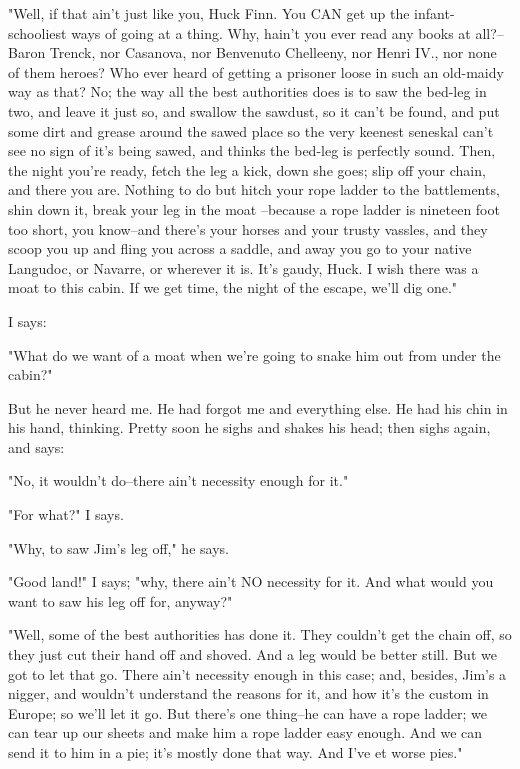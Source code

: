 "Well, if that ain't just like you, Huck Finn.  You CAN get up the
infant-schooliest ways of going at a thing.  Why, hain't you ever read
any books at all?--Baron Trenck, nor Casanova, nor Benvenuto Chelleeny,
nor Henri IV., nor none of them heroes?  Who ever heard of getting a
prisoner loose in such an old-maidy way as that?  No; the way all the
best authorities does is to saw the bed-leg in two, and leave it just so,
and swallow the sawdust, so it can't be found, and put some dirt and
grease around the sawed place so the very keenest seneskal can't see no
sign of it's being sawed, and thinks the bed-leg is perfectly sound.
Then, the night you're ready, fetch the leg a kick, down she goes; slip
off your chain, and there you are.  Nothing to do but hitch your rope
ladder to the battlements, shin down it, break your leg in the moat
--because a rope ladder is nineteen foot too short, you know--and there's
your horses and your trusty vassles, and they scoop you up and fling you
across a saddle, and away you go to your native Langudoc, or Navarre, or
wherever it is. It's gaudy, Huck.  I wish there was a moat to this cabin.
If we get time, the night of the escape, we'll dig one."

I says:

"What do we want of a moat when we're going to snake him out from under
the cabin?"

But he never heard me.  He had forgot me and everything else.  He had his
chin in his hand, thinking.  Pretty soon he sighs and shakes his head;
then sighs again, and says:

"No, it wouldn't do--there ain't necessity enough for it."

"For what?"  I says.

"Why, to saw Jim's leg off," he says.

"Good land!"  I says; "why, there ain't NO necessity for it.  And what
would you want to saw his leg off for, anyway?"

"Well, some of the best authorities has done it.  They couldn't get the
chain off, so they just cut their hand off and shoved.  And a leg would
be better still.  But we got to let that go.  There ain't necessity
enough in this case; and, besides, Jim's a nigger, and wouldn't
understand the reasons for it, and how it's the custom in Europe; so
we'll let it go.  But there's one thing--he can have a rope ladder; we
can tear up our sheets and make him a rope ladder easy enough.  And we
can send it to him in a pie; it's mostly done that way.  And I've et
worse pies."

